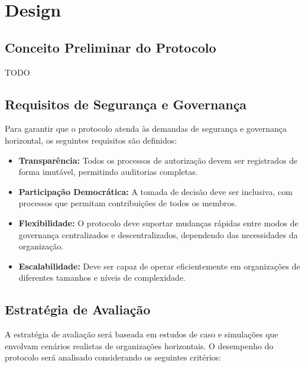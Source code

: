 
%

\chapter{Design}
\label{cha:design}

\glsresetall
 
\section{Conceito Preliminar do Protocolo}
\label{sec:preliminary_protocol_concept}

TODO

\section{Requisitos de Segurança e Governança}
\label{sec:security_governance_requirements}

Para garantir que o protocolo atenda às demandas de segurança e
governança horizontal, os seguintes requisitos são definidos:

\begin{itemize}
    \item \textbf{Transparência:} Todos os processos de autorização
devem ser registrados de forma imutável, permitindo auditorias
completas.
    \item \textbf{Participação Democrática:} A tomada de decisão deve
ser inclusiva, com processos que permitam contribuições de todos os
membros.
    \item \textbf{Flexibilidade:} O protocolo deve suportar mudanças
rápidas entre modos de governança centralizados e descentralizados,
dependendo das necessidades da organização.
    \item \textbf{Escalabilidade:} Deve ser capaz de operar
eficientemente em organizações de diferentes tamanhos e níveis de
complexidade.
\end{itemize}

\section{Estratégia de Avaliação}
\label{sec:evaluation_strategy}

A estratégia de avaliação será baseada em estudos de caso e simulações
que envolvam cenários realistas de organizações horizontais. O
desempenho do protocolo será analisado considerando os seguintes
critérios:

